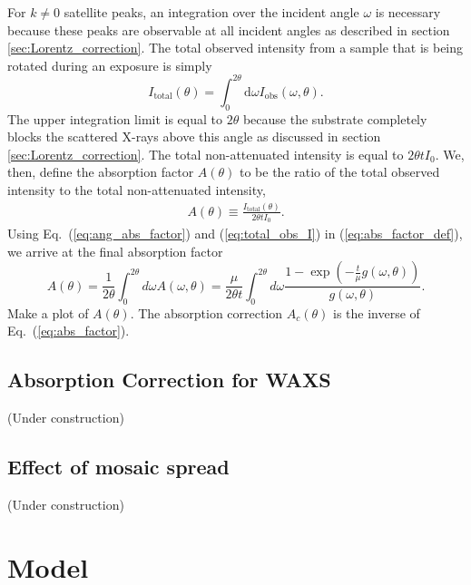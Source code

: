 For $k\neq 0$ satellite peaks, an integration over the incident angle $\omega$
is necessary because these peaks are observable at all incident angles as
described in section \ref{sec:Lorentz_correction}.
The total observed intensity from a sample that is being rotated during 
an exposure is simply
\begin{equation}
  I_{\textrm{total}}(\theta) 
  = \int_0^{2\theta}\textrm{d}\omega I_{\textrm{obs}}(\omega,\theta).
  \label{eq:total_obs_I}
\end{equation}
The upper integration limit is equal to $2\theta$ because the substrate
completely blocks the scattered X-rays above this angle as discussed in 
section \ref{sec:Lorentz_correction}.
The total non-attenuated intensity is equal to $2\theta t I_0$. We, then, 
define the absorption factor $A(\theta)$ to be the ratio of the total 
observed intensity to the total non-attenuated intensity,
\begin{align}
  A(\theta) \equiv \frac{I_\textrm{total}(\theta)}{2\theta tI_0}. 
  \label{eq:abs_factor_def}
\end{align}
Using Eq.~(\ref{eq:ang_abs_factor}) and (\ref{eq:total_obs_I})
in (\ref{eq:abs_factor_def}), we arrive
at the final absorption factor
\begin{equation}
  A(\theta) = \frac{1}{2\theta}\int_0^{2\theta}d\omega A(\omega,\theta)
  = \frac{\mu}{2\theta t} \int_0^{2\theta}d\omega 
  \frac{1-\exp\left(-\frac{t}{\mu}g(\omega,\theta)\right)}{g(\omega,\theta)}.
  \label{eq:abs_factor}
\end{equation}
Make a plot of $A(\theta)$.
The absorption correction $A_c(\theta)$ is the inverse of Eq.~(\ref{eq:abs_factor}). 


\subsection{Absorption Correction for WAXS}
(Under construction)

\subsection{Effect of mosaic spread}
(Under construction)


\section{Model}
